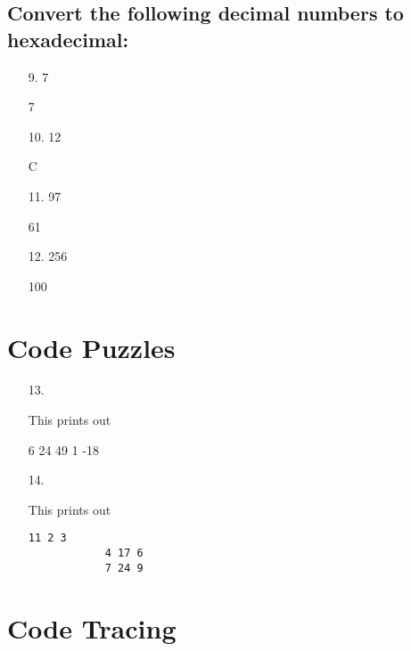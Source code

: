 \documentclass{article}
\begin{document}
\subsection*{Convert the following decimal numbers to hexadecimal:}

\begin{itemize}
	\item[9.] 7
		\begin{answer*}
			7
		\end{answer*}

	\item[10.] 12
		\begin{answer*}
			C
		\end{answer*}

	\item[11.] 97
		\begin{answer*}
			61
		\end{answer*}

	\item[12.] 256
		\begin{answer*}
			100
		\end{answer*}
		
\end{itemize}

\section*{Code Puzzles}

\begin{itemize}
	\item[13.] \begin{answer*}
			This prints out

			6 24 49 1 -18
		\end{answer*}
		
	\item[14.] \begin{answer*}
			This prints out
			\begin{lstlisting}[style=nonumbers]
			11 2 3
			4 17 6
			7 24 9
			\end{lstlisting}
			
		\end{answer*}

\end{itemize}

\section*{Code Tracing}
\end{document}
